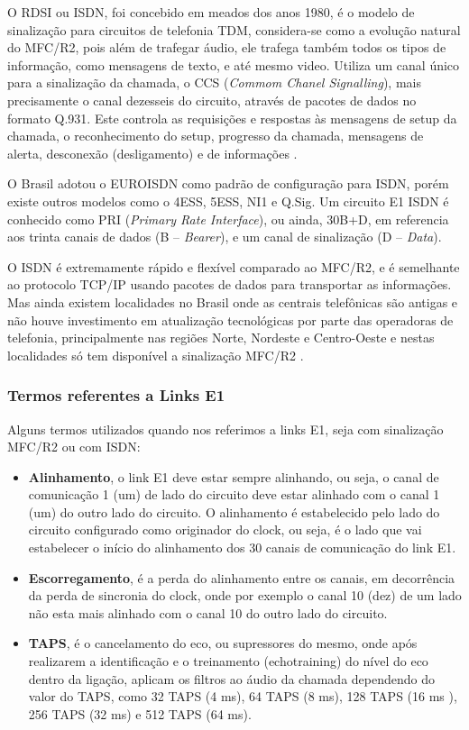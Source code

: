 O RDSI ou ISDN, foi concebido em meados dos anos 1980, é o modelo de sinalização para circuitos de telefonia TDM, considera-se como a evolução natural do MFC/R2, pois além de trafegar áudio, ele trafega também todos os tipos de informação, como mensagens de texto, e até mesmo video. Utiliza um canal único para a sinalização da chamada, o CCS (\textit{Commom Chanel Signalling}), mais precisamente o canal dezesseis do circuito, através de pacotes de dados no formato Q.931. Este controla as requisições e respostas às mensagens de setup da chamada, o reconhecimento do setup, progresso da chamada, mensagens de alerta, desconexão (desligamento) e de informações \cite{alexandrekeller2014}.

O Brasil adotou o EUROISDN como padrão de configuração para ISDN, porém existe outros modelos como o 4ESS, 5ESS, NI1 e Q.Sig. Um circuito E1 ISDN é conhecido como PRI (\textit{Primary Rate Interface}), ou ainda, 30B+D, em referencia aos trinta canais de dados (B – \textit{Bearer}), e um canal de sinalização (D – \textit{Data}).

O ISDN é extremamente rápido e flexível comparado ao MFC/R2, e é semelhante ao protocolo TCP/IP usando pacotes de dados para transportar as informações. Mas ainda existem localidades no Brasil onde as centrais telefônicas são antigas e não houve investimento em atualização tecnológicas por parte das operadoras de telefonia, principalmente nas regiões Norte, Nordeste e Centro-Oeste e nestas localidades só tem disponível a sinalização MFC/R2 \cite{eduardotude2014}.

\subsubsection{Termos referentes a Links E1}
Alguns termos utilizados quando nos referimos a links E1, seja com sinalização MFC/R2 ou com ISDN: \cite{alexandrekeller2014}

\begin{itemize}
  \item \textbf{Alinhamento}, o link E1 deve estar sempre alinhando, ou seja, o canal de comunicação 1 (um) de lado do circuito deve estar alinhado com o canal 1 (um) do outro lado do circuito. O alinhamento é estabelecido pelo lado do circuito configurado como originador do clock, ou seja, é o lado que vai estabelecer o início do alinhamento dos 30 canais de comunicação do link E1.
  \item \textbf{Escorregamento}, é a perda do alinhamento entre os canais, em decorrência da perda de sincronia do clock, onde por exemplo o canal 10 (dez) de um lado não esta mais alinhado com o canal 10 do outro lado do circuito.
  \item \textbf{TAPS}, é o cancelamento do eco, ou supressores do mesmo, onde após realizarem a identificação e o treinamento (echotraining) do nível do eco dentro da ligação, aplicam os filtros ao áudio da chamada dependendo do valor do TAPS, como 32 TAPS (4 ms), 64 TAPS (8 ms), 128 TAPS (16 ms ), 256 TAPS (32 ms) e 512 TAPS (64 ms).
\end{itemize}

